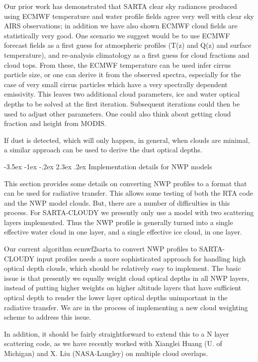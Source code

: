 \documentclass[11pt]{article}
\makeatletter
\newcommand{\sa}{\textsf{SARTA}\xspace}
\newcommand{\sasc}{\textsf{SARTA-CLOUDY}\xspace}
\newcommand{\ecmwfXsarta}{\textsf{ecmwf2sarta}\xspace}
\newcommand{\ecmwf}{\textsf{ECMWF}\xspace}
\renewcommand{\section}{\@startsection {section}{1}{\z@}%
                                   {-3.5ex \@plus -1ex \@minus -.2ex}%
                                   {2.3ex \@plus.2ex}%
                                   {\reset@font\large\bfseries}}
\makeatother
\begin{document}
Our prior work has demonstrated that \sa clear sky radiances produced using 
\ecmwf temperature and water profile fields agree very well with clear sky AIRS
observations; in addition we have also shown \ecmwf cloud fields are statistically 
very good. One scenario we suggest would be to use \ecmwf forecast fields 
as a first guess for atmospheric profiles (T(z) and Q(z) and surface temperature), 
and re-analysis climatology as a first guess for cloud fractions and cloud tops.
From these, the \ecmwf temperature can be used infer cirrus particle size, or
one can derive it from the observed spectra, especially for the case
of very small cirrus particles which have a very spectrally dependent
emissivity.  This leaves two additional cloud parameters, ice and
water optical depths to be solved at the first iteration. Subsequent iterations could
then be used to adjust other parameters. One could also think about getting cloud
fraction and height from MODIS.

If dust is detected, which will only happen, in general, when clouds
are minimal, a similar approach can be used to derive the dust optical
depths. 

\section{Implementation details for NWP models}

This section provides some details on converting NWP profiles to a
format that can be used for radiative transfer.  This allows some
testing of both the RTA code and the NWP model clouds.  But, there are
a number of difficulties in this process.  For \sasc we presently only
use a model with two scattering layers implemented.  Thus the NWP profile is
generally turned into a single effective water cloud in one layer, and
a single effective ice cloud, in one layer.  

Our current algorithm \ecmwfXsarta to convert NWP profiles to \sasc input profiles
needs a more sophisticated approach for handling high optical depth
clouds, which should be relatively easy to implement.  The basic
issue is that presently we equally weight cloud optical depths in all NWP
layers, instead of putting higher weights on higher altitude
layers that have sufficient optical depth to render the lower layer
optical depths unimportant in the radiative transfer. We are in the
process of implementing a new cloud weighting scheme to address this issue.

In addition, it should be fairly 
straightforward to extend this to a \textsf{N} layer scattering code, 
as we have recently worked with Xianglei Huang (U. of Michigan) and 
X. Liu (NASA-Langley) on multiple cloud overlaps.
\end{document}
